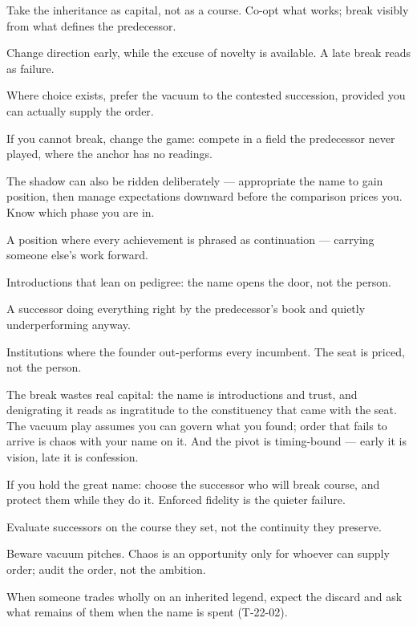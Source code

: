 \begin{application}
  \item Take the inheritance as capital, not as a course. Co-opt what works; break visibly from what defines the predecessor.
  \item Change direction early, while the excuse of novelty is available. A late break reads as failure.
  \item Where choice exists, prefer the vacuum to the contested succession, provided you can actually supply the order.
  \item If you cannot break, change the game: compete in a field the predecessor never played, where the anchor has no readings.
  \item The shadow can also be ridden deliberately --- appropriate the name to gain position, then manage expectations downward before the comparison prices you. Know which phase you are in.
\end{application}

\begin{feedback}
  \item A position where every achievement is phrased as continuation --- carrying someone else's work forward.
  \item Introductions that lean on pedigree: the name opens the door, not the person.
  \item A successor doing everything right by the predecessor's book and quietly underperforming anyway.
  \item Institutions where the founder out-performs every incumbent. The seat is priced, not the person.
\end{feedback}

\begin{failure}
The break wastes real capital: the name is introductions and trust, and denigrating it reads as ingratitude to the constituency that came with the seat. The vacuum play assumes you can govern what you found; order that fails to arrive is chaos with your name on it. And the pivot is timing-bound --- early it is vision, late it is confession.
\end{failure}

\begin{countermeasures}
  \item If you hold the great name: choose the successor who will break course, and protect them while they do it. Enforced fidelity is the quieter failure.
  \item Evaluate successors on the course they set, not the continuity they preserve.
  \item Beware vacuum pitches. Chaos is an opportunity only for whoever can supply order; audit the order, not the ambition.
  \item When someone trades wholly on an inherited legend, expect the discard and ask what remains of them when the name is spent (T-22-02).
\end{countermeasures}

\seesources
{}
